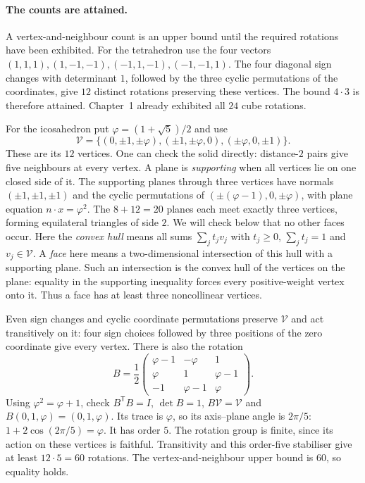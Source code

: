 \paragraph{The counts are attained.}
A vertex-and-neighbour count is an upper bound until the required rotations
have been exhibited. For the tetrahedron use the four vectors
$(1,1,1),(1,-1,-1),(-1,1,-1),(-1,-1,1)$.
The four diagonal sign changes with determinant $1$, followed by the three
cyclic permutations of the coordinates, give $12$ distinct rotations
preserving these vertices. The bound $4\cdot3$ is therefore attained.
Chapter~1 already exhibited all $24$ cube rotations.

For the icosahedron put $\varphi=(1+\sqrt5)/2$ and use
\[
\mathcal V=\{(0,\pm1,\pm\varphi),
             (\pm1,\pm\varphi,0),(\pm\varphi,0,\pm1)\}.
\]
These are its $12$ vertices. One can check the solid directly: distance-$2$
pairs give five neighbours at every vertex. A plane is \emph{supporting} when
all vertices lie on one closed side of it. The supporting planes through
three vertices have normals
$(\pm1,\pm1,\pm1)$ and the cyclic permutations of
$(\pm(\varphi-1),0,\pm\varphi)$, with plane equation
$n\cdot x=\varphi^2$. The $8+12=20$ planes each meet exactly three vertices,
forming equilateral triangles of side $2$. We will check below that no other
faces occur. Here the \emph{convex hull} means all sums $\sum_jt_jv_j$ with
$t_j\ge0$, $\sum_jt_j=1$ and $v_j\in\mathcal V$. A \emph{face} here means a
two-dimensional intersection of this hull with a supporting plane. Such an
intersection is the convex hull of the vertices on the plane: equality in the
supporting inequality forces every positive-weight vertex onto it. Thus a face
has at least three noncollinear vertices.

Even sign changes and cyclic coordinate permutations preserve $\mathcal V$
and act transitively on it: four sign choices followed by three positions
of the zero coordinate give every vertex. There is also the rotation
\[
B=\frac12
\begin{pmatrix}
\varphi-1&-\varphi&1\\
\varphi&1&\varphi-1\\
-1&\varphi-1&\varphi
\end{pmatrix}.
\]
Using $\varphi^2=\varphi+1$, check $B^{\mathsf T}B=I$, $\det B=1$,
$B\mathcal V=\mathcal V$ and $B(0,1,\varphi)=(0,1,\varphi)$.
Its trace is $\varphi$, so its axis--plane angle is $2\pi/5$:
$1+2\cos(2\pi/5)=\varphi$. It has order $5$.
The rotation group is finite, since its action on these vertices is faithful.
Transitivity and this order-five stabiliser give at least $12\cdot5=60$
rotations. The vertex-and-neighbour upper bound is $60$, so equality holds.

